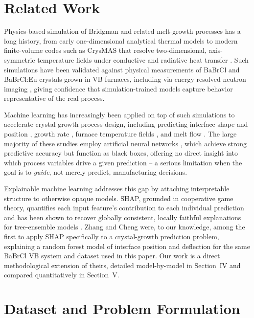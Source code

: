 \documentclass[conference]{IEEEtran}
\begin{document}
\section{Related Work}
Physics-based simulation of Bridgman and related melt-growth processes has a long history, from early one-dimensional analytical thermal models \cite{naumann1982} to modern finite-volume codes such as CrysMAS that resolve two-dimensional, axis-symmetric temperature fields under conductive and radiative heat transfer \cite{crysmas_manual}. Such simulations have been validated against physical measurements of BaBrCl and BaBrCl:Eu crystals grown in VB furnaces, including via energy-resolved neutron imaging \cite{derby_neutron}, giving confidence that simulation-trained models capture behavior representative of the real process.

Machine learning has increasingly been applied on top of such simulations to accelerate crystal-growth process design, including predicting interface shape and position \cite{dang2019}, growth rate \cite{takehara2021}, furnace temperature fields \cite{dropka2019}, and melt flow \cite{tsunooka2018}. The large majority of these studies employ artificial neural networks \cite{dropka_review}, which achieve strong predictive accuracy but function as black boxes, offering no direct insight into which process variables drive a given prediction -- a serious limitation when the goal is to \emph{guide}, not merely predict, manufacturing decisions.

Explainable machine learning addresses this gap by attaching interpretable structure to otherwise opaque models. SHAP, grounded in cooperative game theory, quantifies each input feature's contribution to each individual prediction and has been shown to recover globally consistent, locally faithful explanations for tree-ensemble models \cite{lundberg2017,lundberg2020}. Zhang and Cheng \cite{zhang_cheng2022} were, to our knowledge, among the first to apply SHAP specifically to a crystal-growth prediction problem, explaining a random forest model of interface position and deflection for the same BaBrCl VB system and dataset used in this paper. Our work is a direct methodological extension of theirs, detailed model-by-model in Section~IV and compared quantitatively in Section~V.

\section{Dataset and Problem Formulation}
\end{document}
